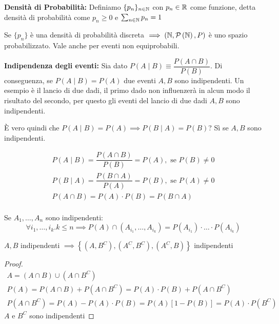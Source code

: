 \begin{defn}
	\textbf{Densità di Probabilità:}
	Definiamo $ \{p_n\}_{n \in \mathbb{N}} $ con $ p_n \in \mathbb{R} $ come funzione, detta densità di probabilità come $ p_n \geq 0 $ e $ \sum_{n \in \mathbb{N}} p_n = 1 $ 
	
	Se $ \{p_n\} $ è una densità di probabilità discreta $ \implies \left( \mathbb{N}, \mathcal{P}\left(\mathbb{N}\right), P\right) $ è uno spazio probabilizzato. Vale anche per eventi non equiprobabili.
\end{defn}

\begin{defn}
	\textbf{Indipendenza degli eventi:} 
	Sia dato $ P(A \mid B) \equiv \dfrac{P(A \cap B)}{P(B)} $. Di conseguenza, se $ P(A \mid B) = P(A) $ due eventi $ A,B $ sono indipendenti. Un esempio è il lancio di due dadi, il primo dado non influenzerà in alcun modo il risultato del secondo, per questo gli eventi del lancio di due dadi $ A,B $ sono indipendenti.
	
	È vero quindi che $ P(A \mid B) = P(A) \implies P(B \mid A) = P(B) $? Sì se $ A,B $ sono indipendenti.
	
	\begin{equation}
	\begin{aligned}
		P(A \mid B) = \dfrac{P(A \cap B)}{P(B)} = P(A), \text{ se } P(B) \neq 0 \\
		P(B \mid A) = \dfrac{P(B \cap A)}{P(A)} = P(B), \text{ se } P(A) \neq 0 \\
		P(A \cap B)  = P(A) \cdot P(B) = P(B \cap A) \\	
	\end{aligned}
	\end{equation}
	
	Se $ A_1, \dots, A_n $ sono indipendenti:
	\begin{equation*}
	\forall i_1, \dots, i_k . k \leq n  \implies P(A)\cap \left(A_{i_1},\dots,A_{i_k}\right) = P(A_{i_1}) \cdot \dots \cdot P(A_{i_k})
	\end{equation*}
\end{defn}


\begin{exmp}
	$ A, B $ indipendenti $ \implies \left\{(A, B^C), (A^C, B^C), (A^C, B) \right\}$ indipendenti
	
	\begin{proof}
		\begin{equation*}
			\begin{aligned}
				A = (A \cap B) \cup (A \cap B^C)  \\
				P(A) = P(A \cap B) + P(A \cap B^C) = P(A) \cdot P(B) + P(A \cap B^C) \\
				P(A \cap B^C) = P(A) - P(A) \cdot P(B) = 
				P(A)\left[1 - P(B)\right] = P(A) \cdot P(B^C) 
			\end{aligned}
		\end{equation*}
		$ A $ e $ B^C $ sono indipendenti
	\end{proof}
\end{exmp}


